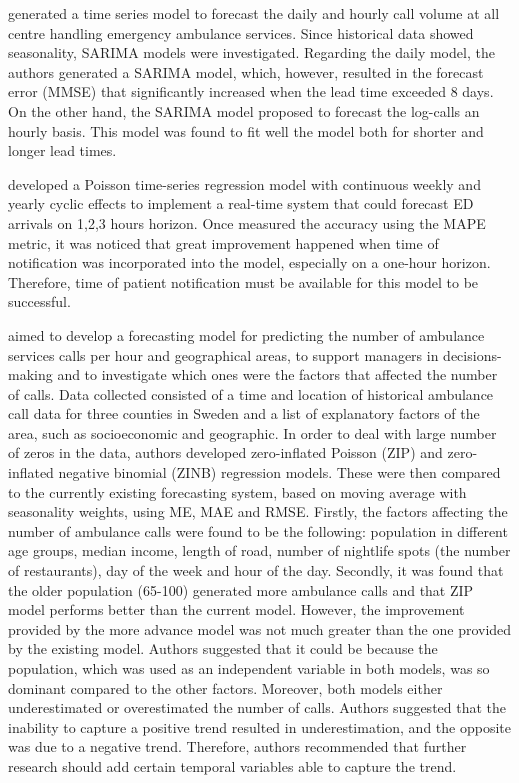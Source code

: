 \documentclass[]{elsarticle} %
\begin{document}
\citet{gijo2016sarima} generated a time series model to forecast the daily and hourly call volume at all centre handling emergency ambulance services. Since historical data showed seasonality, SARIMA models were investigated. Regarding the daily model, the authors generated a SARIMA model, which, however, resulted in the forecast error (MMSE) that significantly increased when the lead time exceeded 8 days. On the other hand, the SARIMA model proposed to forecast the log-calls an hourly basis. This model was found to fit well the model both for shorter and longer lead times.

\citet{asheim2019real} developed a Poisson time-series regression model with continuous weekly and yearly cyclic effects to implement a real-time system that could forecast ED arrivals on 1,2,3 hours horizon. Once measured the accuracy using the MAPE metric, it was noticed that great improvement happened when time of notification was incorporated into the model, especially on a one-hour horizon. Therefore, time of patient notification must be available for this model to be successful.

\citet{steins2019forecasting} aimed to develop a forecasting model for predicting the number of ambulance services calls per hour and geographical areas, to support managers in decisions-making and to investigate which ones were the factors that affected the number of calls.
Data collected consisted of a time and location of historical ambulance call data for three counties in Sweden and a list of explanatory factors of the area, such as socioeconomic and geographic.
In order to deal with large number of zeros in the data, authors developed zero-inflated Poisson (ZIP) and zero-inflated negative binomial (ZINB) regression models. These were then compared to the currently existing forecasting system, based on moving average with seasonality weights, using ME, MAE and RMSE. Firstly, the factors affecting the number of ambulance calls were found to be the following: population in different age groups, median income, length of road, number of nightlife spots (the number of restaurants), day of the week and hour of the day. Secondly, it was found that the older population (65-100) generated more ambulance calls and that ZIP model performs better than the current model. However, the improvement provided by the more advance model was not much greater than the one provided by the existing model. Authors suggested that it could be because the population, which was used as an independent variable in both models, was so dominant compared to the other factors.
Moreover, both models either underestimated or overestimated the number of calls. Authors suggested that the inability to capture a positive trend resulted in underestimation, and the opposite was due to a negative trend. Therefore, authors recommended that further research should add certain temporal variables able to capture the trend.
\end{document}
